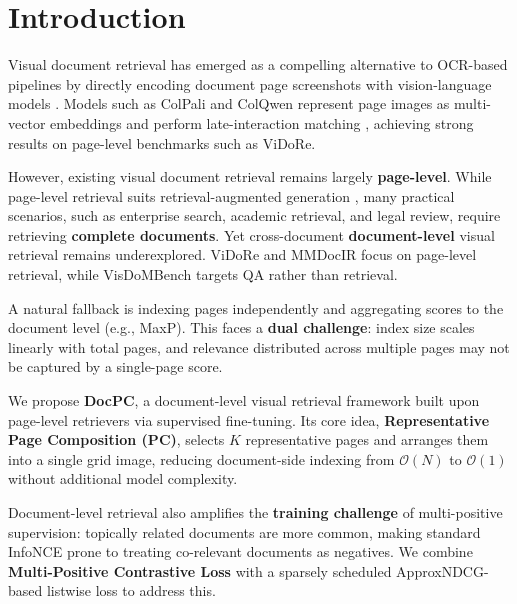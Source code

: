 \section{Introduction}

Visual document retrieval has emerged as a compelling alternative to OCR-based pipelines by directly encoding document page screenshots with vision-language models \citep{faysse2024colpali}. Models such as ColPali and ColQwen represent page images as multi-vector embeddings and perform late-interaction matching \citep{khattab2020colbert,santhanam-etal-2022-colbertv2}, achieving strong results on page-level benchmarks such as ViDoRe.

However, existing visual document retrieval remains largely \textbf{page-level}. While page-level retrieval suits retrieval-augmented generation \citep{lewis2020retrieval}, many practical scenarios, such as enterprise search, academic retrieval, and legal review, require retrieving \textbf{complete documents}. Yet cross-document \textbf{document-level} visual retrieval remains underexplored. ViDoRe \citep{faysse2024colpali,mace2025vidore2} and MMDocIR \citep{dong2025mmdocir} focus on page-level retrieval, while VisDoMBench \citep{suri2025visdombench} targets QA rather than retrieval.

A natural fallback is indexing pages independently and aggregating scores to the document level (e.g., MaxP). This faces a \textbf{dual challenge}: index size scales linearly with total pages, and relevance distributed across multiple pages may not be captured by a single-page score.

We propose \textbf{DocPC}, a document-level visual retrieval framework built upon page-level retrievers via supervised fine-tuning. Its core idea, \textbf{Representative Page Composition (PC)}, selects $K$ representative pages and arranges them into a single grid image, reducing document-side indexing from $\mathcal{O}(N)$ to $\mathcal{O}(1)$ without additional model complexity.

Document-level retrieval also amplifies the \textbf{training challenge} of multi-positive supervision: topically related documents are more common, making standard InfoNCE \citep{oord2018infonce} prone to treating co-relevant documents as negatives. We combine \textbf{Multi-Positive Contrastive Loss} \citep{khosla2020supervised,rivas2024conked} with a sparsely scheduled ApproxNDCG-based listwise loss \citep{qin2010general} to address this.


